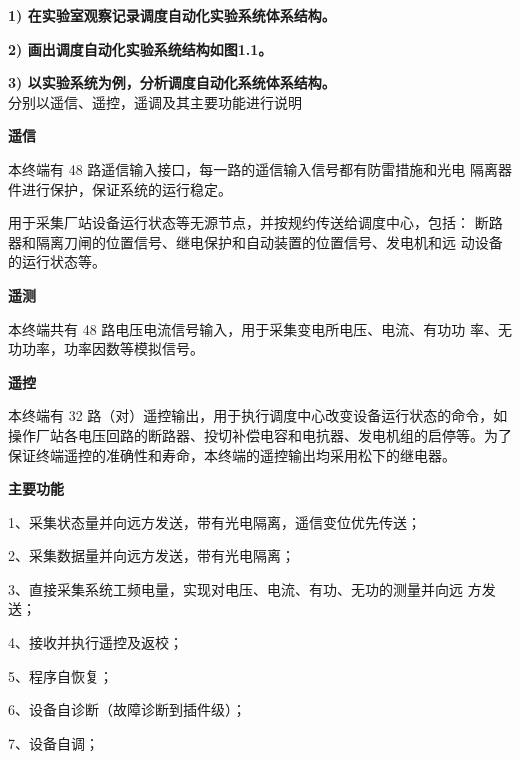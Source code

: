 \documentclass[a4paper]{ctexrep}
\begin{document}
                    \textbf{1) 在实验室观察记录调度自动化实验系统体系结构。}
                    
                    \textbf{2) 画出调度自动化实验系统结构如图1.1。 }
                    
                    \textbf{3) 以实验系统为例，分析调度自动化系统体系结构。} \\

                    分别以遥信、遥控，遥调及其主要功能进行说明
                    
                    \textbf{遥信 }
                    
                    本终端有 48 路遥信输入接口，每一路的遥信输入信号都有防雷措施和光电 隔离器件进行保护，保证系统的运行稳定。 
                    
                    用于采集厂站设备运行状态等无源节点，并按规约传送给调度中心，包括： 断路器和隔离刀闸的位置信号、继电保护和自动装置的位置信号、发电机和远 动设备的运行状态等。 
                    
                    \textbf{遥测  }
                    
                    本终端共有 48 路电压电流信号输入，用于采集变电所电压、电流、有功功 率、无功功率，功率因数等模拟信号。 
                    
                    \textbf{遥控 }
                    
                    本终端有 32 路（对）遥控输出，用于执行调度中心改变设备运行状态的命令，如操作厂站各电压回路的断路器、投切补偿电容和电抗器、发电机组的启停等。为了保证终端遥控的准确性和寿命，本终端的遥控输出均采用松下的继电器。 
                    
                    \textbf{主要功能 }
                    
                    1、采集状态量并向远方发送，带有光电隔离，遥信变位优先传送； 
                    
                    2、采集数据量并向远方发送，带有光电隔离； 
                    
                    3、直接采集系统工频电量，实现对电压、电流、有功、无功的测量并向远 方发送； 
                    
                    4、接收并执行遥控及返校； 
                    
                    5、程序自恢复； 
                    
                    6、设备自诊断（故障诊断到插件级）； 
                    
                    7、设备自调； 
                    
\end{document}
